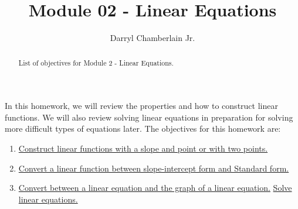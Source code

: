 \documentclass{ximera}
\author{Darryl Chamberlain Jr.}
\title{Module 02 - Linear Equations}
\begin{document}
\begin{abstract}
List of objectives for Module 2 - Linear Equations.
\end{abstract}
\maketitle

In this homework, we will review the properties and how to construct linear functions. We will also review solving linear equations in preparation for solving more difficult types of equations later. The objectives for this homework are:
\begin{enumerate}
	\item \href{https://cnx.org/contents/mwjClAV_@8.1:62_eXnY6@14/Linear-Equations-in-One-Variable}{Construct linear functions with a slope and point or with two points.}
	\item \href{https://cnx.org/contents/mwjClAV_@8.1:62_eXnY6@14/Linear-Equations-in-One-Variable}{Convert a linear function between slope-intercept form and Standard form.}
	\item \href{https://cnx.org/contents/mwjClAV_@8.1:62_eXnY6@14/Linear-Equations-in-One-Variable}{Convert between a linear equation and the graph of a linear equation.} \href{https://cnx.org/contents/mwjClAV_@8.1:62_eXnY6@14/Linear-Equations-in-One-Variable}{Solve linear equations.}
\end{enumerate}
\end{document}
